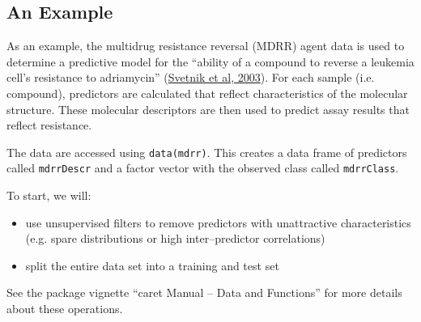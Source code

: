 \documentclass[12pt]{article}
\newcommand{\code}[1]{\mbox{\footnotesize\color{darkblue}\texttt{#1}}}
\begin{document}
\subsection{An Example}

As an example, the multidrug resistance reversal (MDRR) agent data is
used to determine a predictive model for the ``ability of a compound
to reverse a leukemia cell's resistance to adriamycin''
(\href{http://pubs.acs.org/cgi-bin/abstract.cgi/jcisd8/2005/45/i03/abs/ci0500379.html}{Svetnik
  et al, 2003}). For each sample (i.e. compound), predictors are
calculated that reflect characteristics of the molecular
structure. These molecular descriptors are then used to predict assay
results that reflect resistance.  

The data are accessed using \code{data(mdrr)}. This creates a data
frame of predictors called \code{mdrrDescr} and a factor vector with
the observed class called \code{mdrrClass}. 

To start, we will:
 
\begin{itemize}
   \item use unsupervised filters to remove predictors with
     unattractive characteristics (e.g. spare distributions or high
     inter--predictor correlations) 
   \item split the entire data set into a training and test set
\end{itemize}

See the package vignette ``caret Manual -- Data and Functions'' for more details about these operations.
\end{document}

